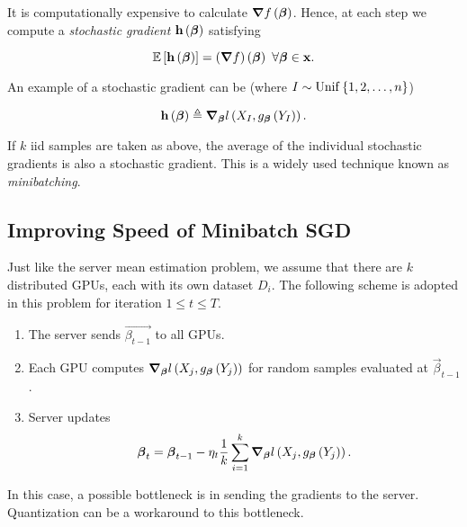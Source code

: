 \documentclass[twoside]{article}
\begin{document}
It is computationally expensive to calculate \(\boldsymbol{\mathbf{\nabla}}f\left(\boldsymbol{\mathbf{\beta}}\right)\). Hence, at each step we compute a \emph{stochastic gradient} \(\boldsymbol{\mathbf{h}}\left(\boldsymbol{\mathbf{\beta}}\right)\) satisfying

\begin{equation}
    \mathbb{E}\left[ \boldsymbol{\mathbf{h}}\left(\boldsymbol{\mathbf{\beta}}\right) \right] = \left(\boldsymbol{\mathbf{\nabla}}f\right)\left(\boldsymbol{\mathbf{\beta}}\right)\ \forall \boldsymbol{\mathbf{\beta}} \in \boldsymbol{\mathbf{x}}.
    \label{eq:stoc-grad-cond}
\end{equation}

An example of a stochastic gradient can be (where \(I\sim\mathrm{Unif}\left\{1,2,\ldots,n\right\}\))

\begin{equation}
    \boldsymbol{\mathbf{h}}\left(\boldsymbol{\mathbf{\beta}}\right) \triangleq \boldsymbol{\mathbf{\nabla}}_{\boldsymbol{\mathbf{\beta}}}l\left(X_I, g_{\boldsymbol{\mathbf{\beta}}}\left(Y_I\right)\right).
    \label{eq:single-stoc-grad}
\end{equation}

If \(k\) iid samples are taken as above, the average of the individual stochastic gradients is also a stochastic gradient. This is a widely used technique known as \emph{minibatching}.

\subsection{Improving Speed of Minibatch SGD}

Just like the server mean estimation problem, we assume that there are \(k\) distributed GPUs, each with its own dataset \(D_i\). The following scheme is adopted in this problem for iteration \(1 \le t \le T\).

\begin{enumerate}
    \item The server sends \(\vec{\beta_{t-1}}\) to all GPUs.
    \item Each GPU computes \(\boldsymbol{\mathbf{\nabla}}_{\boldsymbol{\mathbf{\beta}}}l\left(X_j, g_{\boldsymbol{\mathbf{\beta}}}\left(Y_j\right)\right)\) for random samples evaluated at \(\vec{\beta}_{t-1}\).
    \item Server updates
        \begin{equation}
            \boldsymbol{\mathbf{\beta}}_t = \boldsymbol{\mathbf{\beta}}_{t-1} - \eta_t\frac{1}{k}\sum_{i=1}^k \boldsymbol{\mathbf{\nabla}}_{\boldsymbol{\mathbf{\beta}}}l\left(X_j, g_{\boldsymbol{\mathbf{\beta}}}\left(Y_j\right)\right).
            \label{eq:srv-update}
        \end{equation}
\end{enumerate}

In this case, a possible bottleneck is in sending the gradients to the server. Quantization can be a workaround to this bottleneck.
\end{document}
